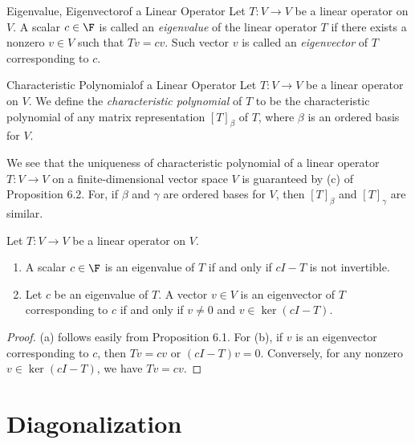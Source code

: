 \documentclass[linearalgebra]{subfiles}
\begin{document}
    \begin{definition}{Eigenvalue, Eigenvector}{of a Linear Operator}
        Let $T: V\to V$ be a linear operator on $V$. A scalar $c\in\F$ is called an \emph{eigenvalue} of the linear operator $T$ if there exists a nonzero $v\in  V$ such that $Tv = c v$. Such vector $v$ is called an \emph{eigenvector} of $T$ corresponding to $c$.
    \end{definition}

    \begin{definition}{Characteristic Polynomial}{of a Linear Operator}
        Let $T:V\to V$ be a linear operator on $V$. We define the \emph{characteristic polynomial} of $T$ to be the characteristic polynomial of any matrix representation $\left[ T \right] _\beta$ of $T$, where $\beta$ is an ordered basis for $V$. 
    \end{definition}

    \begin{remark}
        We see that the uniqueness of characteristic polynomial of a linear operator $T:V\to V$ on a finite-dimensional vector space $V$ is guaranteed by (c) of Proposition 6.2. For, if $\beta$ and $\gamma$ are ordered bases for $V$, then $\left[ T \right]_\beta$ and $\left[ T \right] _\gamma$ are similar. 
    \end{remark}

    \begin{prop}{}
        Let $T:V\to V$ be a linear operator on $V$. 
        \begin{enumerate}
            \item A scalar $c\in\F$ is an eigenvalue of $T$ if and only if $cI-T$ is not invertible.
            \item Let $c$ be an eigenvalue of $T$. A vector $v\in V$ is an eigenvector of $T$ corresponding to $c$ if and only if $v\neq 0$ and $v\in \ker(cI-T)$.
        \end{enumerate}
    \end{prop}

    \begin{proof}
        (a) follows easily from Proposition 6.1. For (b), if $v$ is an eigenvector corresponding to $c$, then $Tv=c v$ or $\left( cI-T \right) v = 0$. Conversely, for any nonzero $v\in\ker\left( cI-T \right)$, we have $Tv = cv$.
    \end{proof}

    \section{Diagonalization}
\end{document}
